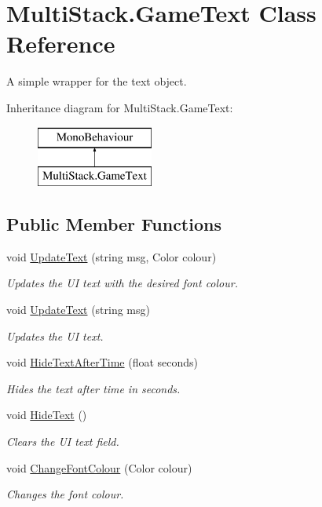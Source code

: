 \hypertarget{class_multi_stack_1_1_game_text}{}\section{Multi\+Stack.\+Game\+Text Class Reference}
\label{class_multi_stack_1_1_game_text}


A simple wrapper for the text object.  


Inheritance diagram for Multi\+Stack.\+Game\+Text\+:\begin{figure}[H]
\begin{center}
\leavevmode
\includegraphics[height=2.000000cm]{class_multi_stack_1_1_game_text}
\end{center}
\end{figure}
\subsection*{Public Member Functions}
\begin{DoxyCompactItemize}
\item 
void \hyperlink{class_multi_stack_1_1_game_text_a55d38f6e4dcfd4b825736558fa3aee5a}{Update\+Text} (string msg, Color colour)
\begin{DoxyCompactList}\small\item\em Updates the U\+I text with the desired font colour. \end{DoxyCompactList}\item 
void \hyperlink{class_multi_stack_1_1_game_text_a1f24ea6be9b694bb21784e27a948820e}{Update\+Text} (string msg)
\begin{DoxyCompactList}\small\item\em Updates the U\+I text. \end{DoxyCompactList}\item 
void \hyperlink{class_multi_stack_1_1_game_text_ad46f062ce89b4a4b05d885c70fbbaf48}{Hide\+Text\+After\+Time} (float seconds)
\begin{DoxyCompactList}\small\item\em Hides the text after time in seconds. \end{DoxyCompactList}\item 
void \hyperlink{class_multi_stack_1_1_game_text_a332f9a4e01cc978cf7e48127a04f9229}{Hide\+Text} ()
\begin{DoxyCompactList}\small\item\em Clears the U\+I text field. \end{DoxyCompactList}\item 
void \hyperlink{class_multi_stack_1_1_game_text_a603da38f9257d8fbc18e033d5cdddf2b}{Change\+Font\+Colour} (Color colour)
\begin{DoxyCompactList}\small\item\em Changes the font colour. \end{DoxyCompactList}\end{DoxyCompactItemize}
